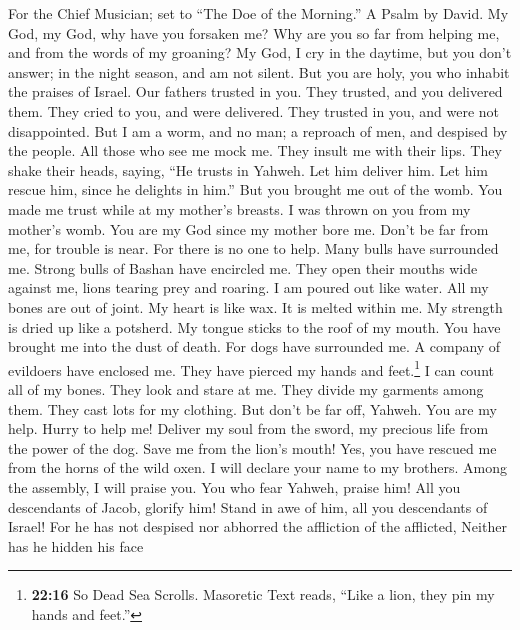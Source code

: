 For the Chief Musician; set to ``The Doe of the Morning.'' A Psalm by
David.  My God, my God, why have you forsaken me? Why are
you so far from helping me, and from the words of my groaning?
 My God, I cry in the daytime, but you don't answer; in
the night season, and am not silent.  But you are holy,
you who inhabit the praises of Israel.  Our fathers
trusted in you. They trusted, and you delivered them. 
They cried to you, and were delivered. They trusted in you, and were not
disappointed.  But I am a worm, and no man; a reproach of
men, and despised by the people.  All those who see me
mock me. They insult me with their lips. They shake their heads, saying,
 ``He trusts in Yahweh. Let him deliver him. Let him
rescue him, since he delights in him.''  But you brought
me out of the womb. You made me trust while at my mother's breasts.
 I was thrown on you from my mother's womb. You are my
God since my mother bore me.  Don't be far from me, for
trouble is near. For there is no one to help.  Many bulls
have surrounded me. Strong bulls of Bashan have encircled me.
 They open their mouths wide against me, lions tearing
prey and roaring.  I am poured out like water. All my
bones are out of joint. My heart is like wax. It is melted within me.
 My strength is dried up like a potsherd. My tongue
sticks to the roof of my mouth. You have brought me into the dust of
death.  For dogs have surrounded me. A company of
evildoers have enclosed me. They have pierced my hands and
feet.\footnote{\textbf{22:16} So Dead Sea Scrolls. Masoretic Text reads,
  ``Like a lion, they pin my hands and feet.''}  I can
count all of my bones. They look and stare at me.  They
divide my garments among them. They cast lots for my clothing.
 But don't be far off, Yahweh. You are my help. Hurry to
help me!  Deliver my soul from the sword, my precious
life from the power of the dog.  Save me from the lion's
mouth! Yes, you have rescued me from the horns of the wild oxen.
 I will declare your name to my brothers. Among the
assembly, I will praise you.  You who fear Yahweh, praise
him! All you descendants of Jacob, glorify him! Stand in awe of him, all
you descendants of Israel!  For he has not despised nor
abhorred the affliction of the afflicted, Neither has he hidden his face
